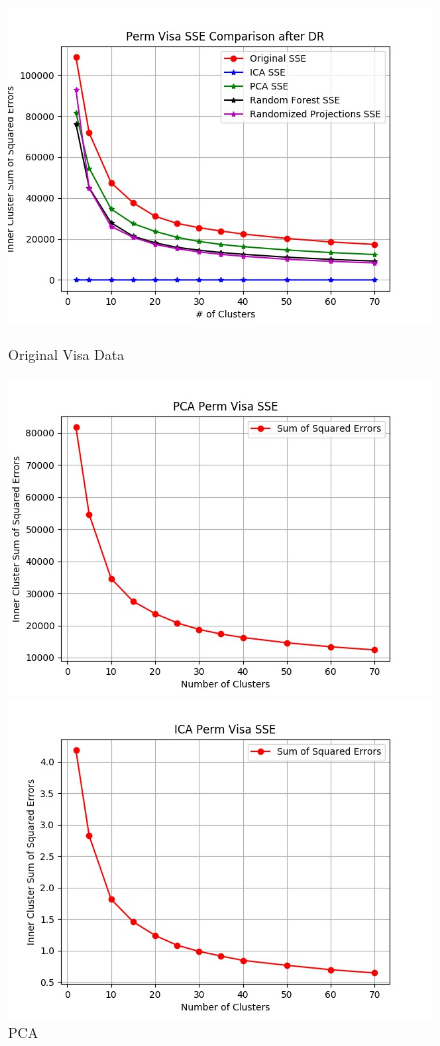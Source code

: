 \documentclass[h]{article}
\begin{document}
 \begin{figure}[H]
      \includegraphics[width=1\textwidth,keepaspectratio]{perm_visa_sse_comparison_after_dr.jpg} 
      \caption*{Original Visa Data} 
   \endminipage\hfill
      \includegraphics[width=1\textwidth,keepaspectratio]{pca_perm_visa_sse.jpg} 
      \caption*{PCA} 
   \endminipage\hfill
      \includegraphics[width=1\textwidth,keepaspectratio]{ica_perm_visa_sse.jpg} 

\end{figure}
\end{document}
